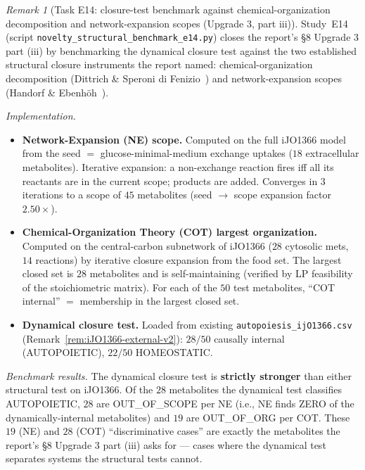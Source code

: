 \documentclass[11pt,a4paper]{article}
\theoremstyle{plain}
\theoremstyle{definition}
\theoremstyle{remark}
\newtheorem{remark}[theorem]{Remark}
\begin{document}
\begin{remark}[Task E14: closure-test benchmark against
chemical-organization decomposition and network-expansion scopes
(Upgrade 3, part iii)]
\label{rem:e14-structural-benchmark}
Study~E14 (script \texttt{novelty\_structural\_benchmark\_e14.py})
closes the report's \S 8 Upgrade 3 part (iii) by benchmarking the
dynamical closure test against the two established structural
closure instruments the report named: chemical-organization
decomposition (Dittrich \& Speroni di
Fenizio~\cite{dittrich2007cot}) and network-expansion scopes
(Handorf \& Ebenh\"oh~\cite{handorf2005network}).

\emph{Implementation.}
\begin{itemize}
\item \textbf{Network-Expansion (NE) scope.} Computed on the full
  iJO1366 model from the seed $=$ glucose-minimal-medium exchange
  uptakes ($18$ extracellular metabolites). Iterative expansion:
  a non-exchange reaction fires iff all its reactants are in the
  current scope; products are added. Converges in $3$ iterations to
  a scope of $45$ metabolites (seed $\to$ scope expansion factor
  $2.50\times$).
\item \textbf{Chemical-Organization Theory (COT) largest organization.}
  Computed on the central-carbon subnetwork of iJO1366 ($28$
  cytosolic mets, $14$ reactions) by iterative closure expansion
  from the food set. The largest closed set is $28$ metabolites and
  is self-maintaining (verified by LP feasibility of the
  stoichiometric matrix). For each of the $50$ test metabolites,
  ``COT internal'' $=$ membership in the largest closed set.
\item \textbf{Dynamical closure test.} Loaded from existing
  \texttt{autopoiesis\_ijO1366.csv} (Remark~\ref{rem:iJO1366-external-v2}):
  $28/50$ causally internal (AUTOPOIETIC), $22/50$ HOMEOSTATIC.
\end{itemize}

\emph{Benchmark results.} The dynamical closure test is
\textbf{strictly stronger} than either structural test on iJO1366.
Of the $28$ metabolites the dynamical test classifies AUTOPOIETIC,
$28$ are OUT\_OF\_SCOPE per NE (i.e., NE finds ZERO of the
dynamically-internal metabolites) and $19$ are OUT\_OF\_ORG per COT.
These $19$ (NE) and $28$ (COT) ``discriminative cases'' are exactly
the metabolites the report's \S 8 Upgrade 3 part (iii) asks for ---
cases where the dynamical test separates systems the structural
tests cannot.


\end{remark}
\end{document}

